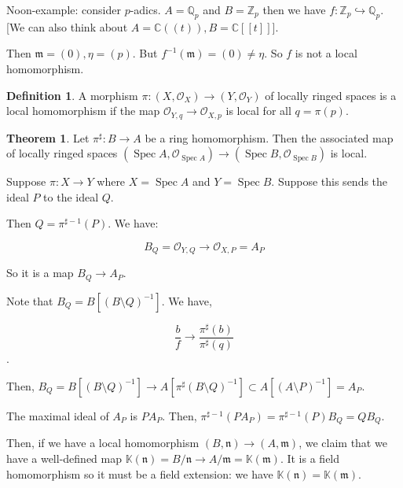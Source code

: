 \documentclass{article}
\theoremstyle{definition}
\newtheorem*{definition}{Definition}
\newtheorem{theorem}{Theorem}
\begin{document}
    Noon-example: consider \(p\)-adics. \(A = \mathbb{Q}_p\) and \(B =\mathbb{Z}_p\) then we have \(f: \mathbb{Z}_p \hookrightarrow \mathbb{Q}_p\). [We can also think about \(A = \mathbb{C} ((t)), B = \mathbb{C} [[t]]\)].

    Then \(\mathfrak{m} = (0), \mathfrak{\eta} = (p)\). But \(f ^{-1} (\mathfrak{m}) = (0) \neq \eta\). So \(f\) is not a local homomorphism.

    \begin{definition}
        A morphism \(\pi : (X, \mathcal{O} _X) \to (Y, \mathcal{O} _Y)\) of locally ringed spaces is a local homomorphism if the map \(\mathcal{O}_{Y,q} \to \mathcal{O}_{X,p}\) is local for all \(q = \pi (p)\). 
    \end{definition}

    \begin{theorem}
        Let \(\pi^\sharp : B \to A\) be a ring homomorphism. Then the associated map of locally ringed spaces \((\operatorname{Spec} A, \mathcal{O}_{\operatorname{Spec} A}) \to (\operatorname{Spec} B, \mathcal{O}_{\operatorname{Spec} B})\) is local.
    \end{theorem}

    Suppose \(\pi: X \to Y\) where \(X = \operatorname{Spec} A\) and \(Y = \operatorname{Spec} B\). Suppose this sends the ideal \(P\) to the ideal \(Q\).

    Then \(Q = \pi ^{\sharp -1} (P)\). We have: 

    \[
        B_Q = \mathcal{O} _{Y,Q} \to \mathcal{O} _{X,P} = A_P
    \]

    So it is a map \(B_Q \to A_P\).

    Note that \(B_Q = B[(B \setminus Q) ^{-1}]\). We have,
    
    \[
        \frac{b}{f} \to \frac{\pi^\sharp (b)}{\pi^\sharp (q)}
    \].

    Then, \(B_Q = B[(B \setminus Q)^{-1}] \to A [ \pi ^\sharp (B \setminus Q) ^{-1}] \subset A[ (A \setminus P) ^{-1}] = A_P\).
    
    The maximal ideal of \(A_P\) is \(PA_P\). Then, \(\pi^{\sharp -1} (P A_P) = \pi^{\sharp - 1}(P) B_Q = QB_Q\).
    
    Then, if we have a local homomorphism \((B,\mathfrak{n}) \to (A,\mathfrak{m})\), we claim that we have a well-defined map \(\mathbb{K} (\mathfrak{n}) = B / \mathfrak{n} \to A / \mathfrak{m} = \mathbb{K} (\mathfrak{m})\). It is a field homomorphism so it must be a field extension: we have \(\mathbb{K} (\mathfrak{n}) = \mathbb{K} (\mathfrak{m})\).
    
\end{document}
